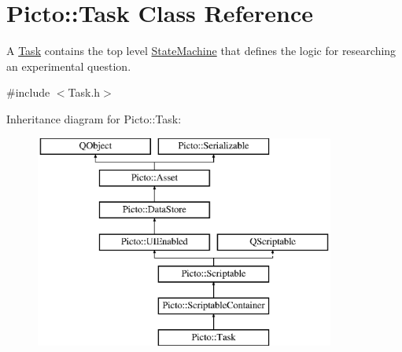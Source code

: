 \hypertarget{class_picto_1_1_task}{\section{Picto\-:\-:Task Class Reference}
\label{class_picto_1_1_task}
}


A \hyperlink{class_picto_1_1_task}{Task} contains the top level \hyperlink{class_picto_1_1_state_machine}{State\-Machine} that defines the logic for researching an experimental question.  




{\ttfamily \#include $<$Task.\-h$>$}

Inheritance diagram for Picto\-:\-:Task\-:\begin{figure}[H]
\begin{center}
\leavevmode
\includegraphics[height=7.000000cm]{class_picto_1_1_task}
\end{center}
\end{figure}
